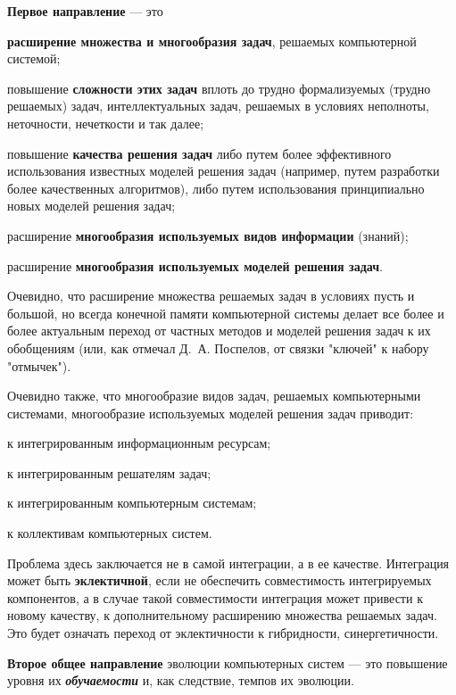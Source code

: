 \textbf{Первое направление} --- это 
\begin{textitemize}
	\item \textbf{расширение множества и многообразия задач}, решаемых компьютерной системой; 
	\item повышение \textbf{сложности этих задач} вплоть до трудно формализуемых (трудно решаемых) задач, интеллектуальных задач, решаемых в условиях неполноты, неточности, нечеткости и так далее;
	\item повышение \textbf{качества решения задач} либо путем более эффективного использования известных моделей решения задач (например, путем разработки более качественных алгоритмов), либо путем использования принципиально новых моделей решения задач;
	\item расширение \textbf{многообразия используемых видов информации} (знаний);
	\item расширение \textbf{многообразия используемых моделей решения задач}.
\end{textitemize}

Очевидно, что расширение множества решаемых задач в условиях пусть и большой, но всегда конечной памяти компьютерной системы делает все более и более актуальным переход от частных методов и моделей решения задач к их обобщениям (или, как отмечал Д.~А. Поспелов, от связки "ключей"{} к набору "отмычек").

Очевидно также, что многообразие видов задач, решаемых компьютерными системами, многообразие используемых моделей решения задач приводит: 
\begin{textitemize}
	\item к интегрированным информационным ресурсам;
	\item к интегрированным решателям задач;
	\item к интегрированным компьютерным системам;
	\item к коллективам компьютерных систем.
\end{textitemize}

Проблема здесь заключается не в самой интеграции, а в ее качестве. Интеграция может быть \textbf{эклектичной}, если не обеспечить совместимость интегрируемых компонентов, а в случае такой совместимости интеграция может привести к новому качеству, к дополнительному расширению множества решаемых задач. Это будет означать переход от эклектичности к гибридности, синергетичности.

\textbf{Второе общее направление} эволюции компьютерных систем --- это повышение уровня их \textbf{\textit{обучаемости}} и, как следствие, темпов их эволюции.

